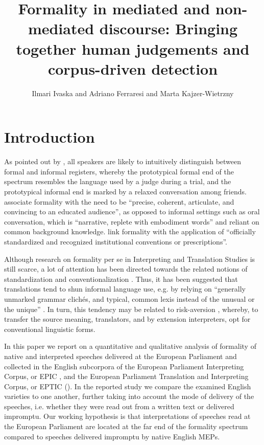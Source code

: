 \documentclass[output=paper]{langscibook}
\author{Ilmari Ivaska\orcid{}\affiliation{University of Turku} and Adriano Ferraresi\orcid{}\affiliation{University of Bologna} and Marta Kajzer-Wietrzny\orcid{}\affiliation{Adam Mickiewicz University} }
\title[Formality in mediated and non-mediated discourse]{Formality in mediated and non-mediated discourse: Bringing together human judgements and corpus-driven detection}
\begin{document}
\maketitle



\section{Introduction}\label{sec:ivaska:1}

As pointed out by \citet{HeylighenDewaele1999}, all speakers are likely to intuitively distinguish between formal and informal registers, whereby the prototypical formal end of the spectrum resembles the language used by a judge during a trial, and the prototypical informal end is marked by a relaxed conversation among friends. \citet[218]{GraesserEtAl2014} associate formality with the need to be “precise, coherent, articulate, and convincing to an educated audience”, as opposed to informal settings such as oral conversation, which is “narrative, replete with embodiment words” and reliant on common background knowledge. \citet[224]{AndrenEtAl2010} link formality with the application of “officially standardized and recognized institutional conventions or prescriptions”.

Although research on formality per se in Interpreting and Translation Studies is still scarce, a lot of attention has been directed towards the related notions of standardization \citep{Toury1995} and conventionalization \citep{Baker1993}. Thus, it has been suggested that translations tend to shun informal language use, e.g. by relying on “generally unmarked grammar clichés, and typical, common lexis instead of the unusual or the unique” \citep[41]{Mauranen2008}. In turn, this tendency may be related to risk-aversion \citep{Pym2005}, whereby, to transfer the source meaning, translators, and by extension interpreters, opt for conventional linguistic forms. 

In this paper we report on a quantitative and qualitative analysis of formality of native and interpreted speeches delivered at the European Parliament and collected in the English subcorpora of the European Parliament Interpreting Corpus, or EPIC \citep{SandrelliEtAl2010}, and the European Parliament Translation and Interpreting Corpus, or EPTIC (\citealt{FerraresiBernardini2019}). In the reported study we compare the examined English varieties to one another, further taking into account the mode of delivery of the speeches, i.e. whether they were read out from a written text or delivered impromptu. Our working hypothesis is that interpretations of speeches read at the European Parliament are located at the far end of the formality spectrum compared to speeches delivered impromptu by native English MEPs.
\end{document}
